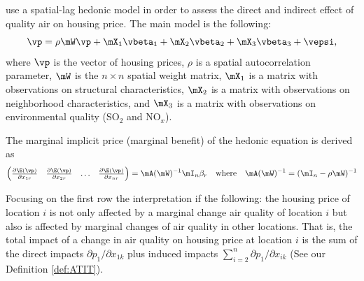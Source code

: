 \documentclass[english,12pt]{book}\usepackage[]{graphicx}\usepackage[]{xcolor}
\begin{document}
\begin{example}\label{example:pollution-kim}
\cite{kim2003measuring} use a spatial-lag hedonic model in order to assess the direct and indirect effect of quality air on housing price.  The main model is the following:
\begin{equation*}
\vp = \rho\mW\vp + \mX_1\vbeta_1 + \mX_2\vbeta_2 + \mX_3\vbeta_3 + \vepsi,
\end{equation*}
%
where $\vp$ is the vector of housing prices, $\rho$ is a spatial autocorrelation parameter, $\mW$ is the $n\times n$ spatial weight matrix, $\mX_1$ is a matrix with observations on structural characteristics, $\mX_2$ is a matrix with observations on neighborhood characteristics, and $\mX_3$ is a matrix with observations on environmental quality (SO$_2$ and NO$_x$). 

The marginal implicit price (marginal benefit) of the hedonic equation is derived as
\begin{equation*}
\begin{pmatrix}
  \frac{\partial \E(\vp)}{\partial x_{1r}} & \frac{\partial \E(\vp)}{\partial x_{2r}} & \hdots & \frac{\partial \E(\vp)}{\partial x_{nr}} 
   \end{pmatrix} = \mA(\mW)^{-1}\mI_n\beta_r\quad \mbox{where}\quad \mA(\mW)^{-1} = (\mI_n - \rho\mW)^{-1}
\end{equation*}

Focusing on the first row the interpretation if the following: the housing price of location $i$ is not only affected by a marginal change air quality of location $i$ but also is affected by marginal changes of air quality in other locations. That is, the total impact of a change in air quality on housing price at location $i$ is the sum of the direct impacts $\partial p_1/\partial x_{1k}$ plus induced impacts $\sum_{i = 2}^n \partial p_1 / \partial x_{ik}$ (See our Definition \ref{def:ATIT}). 


\end{example}
\end{document}
